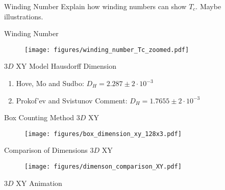 \documentclass[10pt]{beamer}
\begin{document}
\begin{frame}{Winding Number}
    Explain how winding numbers can show $T_c$. Maybe illustrations.
\end{frame}

\begin{frame}{Winding Number}
    \begin{figure}[h!]
        \centering
            \texttt{[image: figures/winding\_number\_Tc\_zoomed.pdf]}
    \end{figure}
\end{frame}

\begin{frame}{$3D$ XY Model Hausdorff Dimension}
    \begin{enumerate}[$\bullet$]
        \item Hove, Mo and Sudbo: $D_H = 2.287 \pm 2 \cdot 10^{-3}$
        \item Prokof'ev and Svistunov Comment: $D_H = 1.7655 \pm 2 \cdot 10^{-3}$
    \end{enumerate}
\end{frame}

\begin{frame}{Box Counting Method $3D$ XY}
    \begin{figure}[h!]
        \centering
            \texttt{[image: figures/box\_dimension\_xy\_128x3.pdf]}
    \end{figure}
\end{frame}

\begin{frame}{Comparison of Dimensions $3D$ XY}
    \begin{figure}[h!]
        \centering
            \texttt{[image: figures/dimenson\_comparison\_XY.pdf]}
    \end{figure}
\end{frame}


\begin{frame}{$3D$ XY Animation}
\end{frame}
\end{document}
